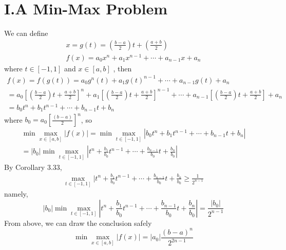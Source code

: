 \documentclass[twoside,a4paper,12pt]{article}
\begin{document}
\pagestyle{fancy}
\fancyhead{}

\section*{I.A Min-Max Problem} 
We can define 
\begin{gather}
x=g(t)=(\frac{b-a}{2})t+(\frac{a+b}{2})\\
f(x)=a_0x^n+a_1x^{n-1}+\cdots+a_{n-1}x+a_n
\end{gather}
where $t \in [-1,1]$ and $x \in [a,b]$ , then
\begin{gather}
f(x)=f(g(t))=a_0g^n(t)+a_1g(t)^{n-1}+\cdots+a_{n-1}g(t)+a_n \\
=a_0[(\frac{b-a}{2})t+\frac{a+b}{2}]^n+a_1[(\frac{b-a}{2})t+\frac{a+b}{2}]^{n-1}+\cdots+a_{n-1}[(\frac{b-a}{2})t+\frac{a+b}{2}]+a_n\\
=b_0t^n+b_1t^{n-1}+\cdots+b_{n-1}t+b_n
\end{gather}
where $b_0=a_0[\frac{(b-a)}{2}]^n$, so
\begin{gather}
\min\max_{x\in[a,b]}|f(x)|=\min\max_{t\in [-1,1]}|b_0t^n+b_1t^{n-1}+\cdots+b_{n-1}t+b_n|\\
=|b_0|\min\max_{t\in [-1,1]}|t^n+\frac{b_1}{b_0}t^{n-1}+\cdots+\frac{b_{n-1}}{b_0}t+\frac{b_n}{b_0}|
\end{gather}
By Corollary 3.33,
\begin{gather}
\max_{t\in [-1,1]}|t^n+\frac{b_1}{b_0}t^{n-1}+\cdots+\frac{b_{n-1}}{b_0}t+\frac{b_n}{b_0}\geq \frac{1}{2^{n-1}}
\end{gather}
namely,
\[
|b_0|\min\max_{t\in [-1,1]}|t^n+\frac{b_1}{b_0}t^{n-1}+\cdots+\frac{b_{n-1}}{b_0}t+\frac{b_n}{b_0}|=\frac{|b_0|}{2^{n-1}}
\]
From above, we can draw the conclusion safely
\[
\min\max_{x\in[a,b]}|f(x)|=|a_0|\frac{(b-a)^n}{2^{2n-1}}
\]
\end{document}
